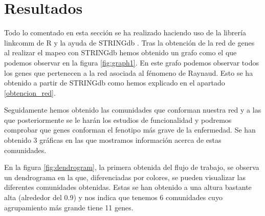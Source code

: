 \section{Resultados}

\begin{spacing}{1}
Todo lo comentado en esta sección se ha realizado haciendo uso de la librería linkcomm de R  \cite{Linkcomm}  y la ayuda de STRINGdb \cite{STRINGdb} . 
Tras la obtención de la red de genes al realizar el mapeo con STRINGdb hemos obtenido un grafo como el que podemos observar en la figura \ref{fig:graph1}. En este grafo podemos observar todos los genes que pertenecen a la red asociada al fénomeno de Raynaud. Esto se ha obtenido a partir de STRINGdb como hemos explicado en el apartado \ref{obtencion_red}.
\end{spacing}

\begin{minipage}{\linewidth}
	\label{fig:graph1}
\end{minipage}

\begin{spacing}{1}
	Seguidamente hemos obtenido las comunidades que conforman nuestra red y a las que posteriormente se le harán los estudios de funcionalidad y podremos comprobar que genes conforman el fenotipo más grave de la enfermedad. Se han obtenido 3 gráficas en las que mostramos información acerca de estas comunidades.
	
	En la figura \ref{fig:dendrogram}, la primera obtenida del flujo de trabajo, se observa un dendrograma en la que, diferenciadas por colores, se pueden visualizar las diferentes comunidades obtenidas. Estas se han obtenido a una altura bastante alta (alrededor del 0.9) y nos indica que tenemos 6 comunidades cuyo agrupamiento más grande tiene 11 genes.
\end{spacing}

